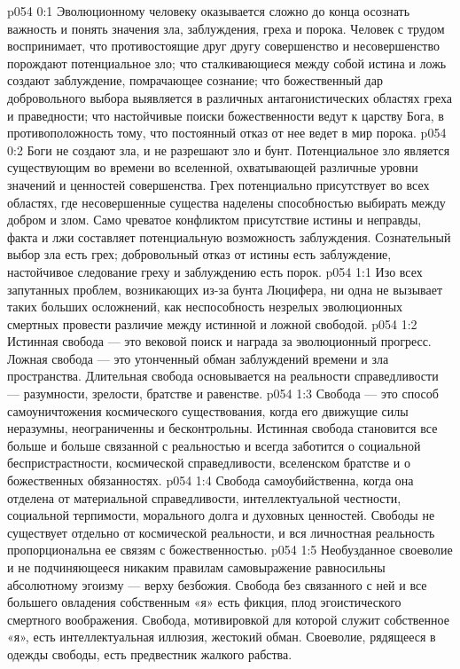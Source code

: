 \author{Могучий Вестник}
\vs p054 0:1 Эволюционному человеку оказывается сложно до конца осознать важность и понять значения зла, заблуждения, греха и порока. Человек с трудом воспринимает, что противостоящие друг другу совершенство и несовершенство порождают потенциальное зло; что сталкивающиеся между собой истина и ложь создают заблуждение, помрачающее сознание; что божественный дар добровольного выбора выявляется в различных антагонистических областях греха и праведности; что настойчивые поиски божественности ведут к царству Бога, в противоположность тому, что постоянный отказ от нее ведет в мир порока.
\vs p054 0:2 Боги не создают зла, и не разрешают зло и бунт. Потенциальное зло является существующим во времени во вселенной, охватывающей различные уровни значений и ценностей совершенства. Грех потенциально присутствует во всех областях, где несовершенные существа наделены способностью выбирать между добром и злом. Само чреватое конфликтом присутствие истины и неправды, факта и лжи составляет потенциальную возможность заблуждения. Сознательный выбор зла есть грех; добровольный отказ от истины есть заблуждение, настойчивое следование греху и заблуждению есть порок.
\vs p054 1:1 Изо всех запутанных проблем, возникающих из\hyp{}за бунта Люцифера, ни одна не вызывает таких больших осложнений, как неспособность незрелых эволюционных смертных провести различие между истинной и ложной свободой.
\vs p054 1:2 Истинная свобода --- это вековой поиск и награда за эволюционный прогресс. Ложная свобода --- это утонченный обман заблуждений времени и зла пространства. Длительная свобода основывается на реальности справедливости --- разумности, зрелости, братстве и равенстве.
\vs p054 1:3 Свобода --- это способ самоуничтожения космического существования, когда его движущие силы неразумны, неограниченны и бесконтрольны. Истинная свобода становится все больше и больше связанной с реальностью и всегда заботится о социальной беспристрастности, космической справедливости, вселенском братстве и о божественных обязанностях.
\vs p054 1:4 Свобода самоубийственна, когда она отделена от материальной справедливости, интеллектуальной честности, социальной терпимости, морального долга и духовных ценностей. Свободы не существует отдельно от космической реальности, и вся личностная реальность пропорциональна ее связям с божественностью.
\vs p054 1:5 Необузданное своеволие и не подчиняющееся никаким правилам самовыражение равносильны абсолютному эгоизму --- верху безбожия. Свобода без связанного с ней и все большего овладения собственным «я» есть фикция, плод эгоистического смертного воображения. Свобода, мотивировкой для которой служит собственное «я», есть интеллектуальная иллюзия, жестокий обман. Своеволие, рядящееся в одежды свободы, есть предвестник жалкого рабства.
